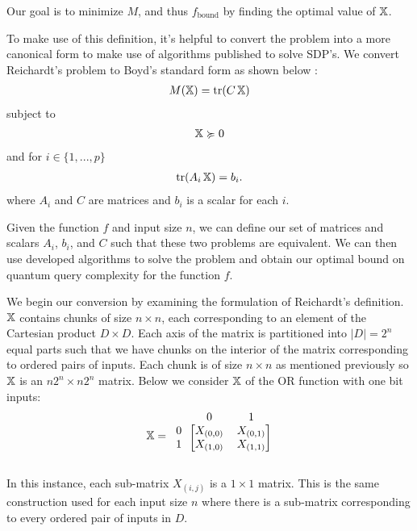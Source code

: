 Our goal is to minimize $M$, and thus $f_{\text{bound}}$ by finding the optimal value of $\operatorname{\mathbb{X}}$.

To make use of this definition, it's helpful to convert
the problem into a more canonical form to make use of algorithms published to solve SDP's. We convert Reichardt's problem 
to Boyd's standard form as shown below \cite{boyd2004convex}:
\begin{align}\label{Eq:boyd_obj}
    M(\operatorname{\mathbb{X}}) = \operatorname{\text{tr}}(C\operatorname{\mathbb{X}}) 
\end{align}
subject to
\begin{align} \label{Eq:boydSemi}
    \operatorname{\mathbb{X}} \succcurlyeq 0   
\end{align}
and for $i \in \{1,...,p\}$
\begin{align} \label{Eq:boydTraceCon}
    \operatorname{\text{tr}}(A_i \operatorname{\mathbb{X}}) = b_i. 
\end{align}
where $A_i$ and $C$ are matrices and $b_i$ is a scalar for each $i$.

Given the function $f$ and input size $n$,
we can define our set of matrices
and scalars $A_i$, $b_i$, and $C$ such that these two
problems are equivalent. We can then use developed algorithms to solve the problem and obtain our optimal bound on quantum query complexity for the function $f$.

We begin our conversion by examining the formulation of Reichardt's definition. 
$\operatorname{\mathbb{X}}$ contains chunks of size 
$n \times n$, each corresponding to an element of the Cartesian product 
$D \times D$. Each axis of the matrix is partitioned into $|D| = 2^n$ 
equal parts such that we have chunks on the interior of the matrix 
corresponding to ordered pairs of inputs. Each chunk is of 
size $n \times n$ as mentioned previously so $\operatorname{\mathbb{X}}$ is an 
$n2^n \times n2^n$ matrix. Below we consider $\operatorname{\mathbb{X}}$ of the 
OR function with one bit inputs:
\begin{align}
\X = \begin{blockarray}{ccc}
\qquad & 0 & 1 \\
\begin{block}{c[cc]}
  0 & X_{(0,0)} & X_{(0,1)} \\
  1 & X_{(1,0)} & X_{(1,1)} \\
\end{block}
\end{blockarray}
\end{align}

In this instance, each sub-matrix $X_{(i,j)}$ is a $ 1
\times 1 $ matrix. This is the same construction used for
each input size $n$ where there is a sub-matrix
corresponding to every ordered pair of inputs in $D$.

